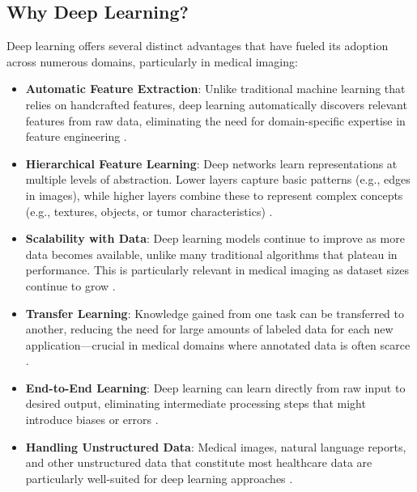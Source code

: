 
\subsection{Why Deep Learning?}
\label{sec:why_dl}

Deep learning offers several distinct advantages that have fueled its adoption across numerous domains, particularly in medical imaging:

\begin{itemize}
  \item \textbf{Automatic Feature Extraction}: Unlike traditional machine learning that relies on handcrafted features, deep learning automatically discovers relevant features from raw data, eliminating the need for domain-specific expertise in feature engineering \cite{shen2017deep}.

  \item \textbf{Hierarchical Feature Learning}: Deep networks learn representations at multiple levels of abstraction. Lower layers capture basic patterns (e.g., edges in images), while higher layers combine these to represent complex concepts (e.g., textures, objects, or tumor characteristics) \cite{shen2017deep}.

  \item \textbf{Scalability with Data}: Deep learning models continue to improve as more data becomes available, unlike many traditional algorithms that plateau in performance. This is particularly relevant in medical imaging as dataset sizes continue to grow \cite{shen2017deep}.

  \item \textbf{Transfer Learning}: Knowledge gained from one task can be transferred to another, reducing the need for large amounts of labeled data for each new application—crucial in medical domains where annotated data is often scarce \cite{tajbakhsh2016convolutional}.

  \item \textbf{End-to-End Learning}: Deep learning can learn directly from raw input to desired output, eliminating intermediate processing steps that might introduce biases or errors \cite{nguyen2020end}.

  \item \textbf{Handling Unstructured Data}: Medical images, natural language reports, and other unstructured data that constitute most healthcare data are particularly well-suited for deep learning approaches \cite{shen2017deep}.
\end{itemize}

